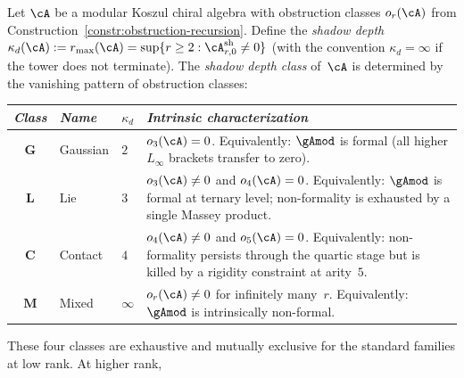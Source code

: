 \begin{definition}
\label{def:shadow-depth-classification}
\ClaimStatusProvedHere
{}
Let $\cA$ be a modular Koszul chiral algebra with
obstruction classes $o_r(\cA)$ from
Construction~\ref{constr:obstruction-recursion}.
Define the \emph{shadow depth}
$\kappa_d(\cA) := r_{\max}(\cA) =
\sup\{r \geq 2 : \cA^{\mathrm{sh}}_{r,0} \neq 0\}$
(with the convention $\kappa_d = \infty$ if the tower
does not terminate).
The \emph{shadow depth class} of~$\cA$ is determined
by the vanishing pattern of obstruction classes:
\begin{center}
\small
\renewcommand{\arraystretch}{1.15}
\begin{tabular}{clll}
\toprule
\emph{Class} & \emph{Name} & $\kappa_d$ &
\emph{Intrinsic characterization} \\
\midrule
$\mathbf{G}$ & Gaussian &
  $2$ &
  \begin{minipage}[t]{0.42\textwidth}\raggedright
  $o_3(\cA) = 0$.  Equivalently: $\gAmod$ is formal
  (all higher $L_\infty$ brackets transfer to zero).
  \end{minipage} \\[6pt]
$\mathbf{L}$ & Lie &
  $3$ &
  \begin{minipage}[t]{0.42\textwidth}\raggedright
  $o_3(\cA) \neq 0$ and $o_4(\cA) = 0$.  Equivalently:
  $\gAmod$ is formal at ternary level; non-formality
  is exhausted by a single Massey product.
  \end{minipage} \\[6pt]
$\mathbf{C}$ & Contact &
  $4$ &
  \begin{minipage}[t]{0.42\textwidth}\raggedright
  $o_4(\cA) \neq 0$ and $o_5(\cA) = 0$.  Equivalently:
  non-formality persists through the quartic stage
  but is killed by a rigidity constraint at arity~$5$.
  \end{minipage} \\[6pt]
$\mathbf{M}$ & Mixed &
  $\infty$ &
  \begin{minipage}[t]{0.42\textwidth}\raggedright
  $o_r(\cA) \neq 0$ for infinitely many~$r$.
  Equivalently: $\gAmod$ is intrinsically non-formal.
  \end{minipage} \\
\bottomrule
\end{tabular}
\end{center}
These four classes are exhaustive and mutually exclusive
for the standard families at low rank.  At higher rank,

\end{definition}
